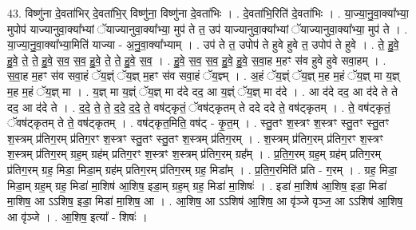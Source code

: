 \documentclass[17pt]{extarticle}
\begin{document}
43. विष्णु॑ना दे॒वता॑भिर् दे॒वता॑भि॒र् विष्णु॑ना॒ विष्णु॑ना दे॒वता॑भिः । . दे॒वता॑भि॒रिति॑ दे॒वता॑भिः । . या॒ज्या॒नु॒वा॒क्या᳚भ्या॒ मुपोप॑ याज्यानुवा॒क्या᳚भ्यां ॅयाज्यानुवा॒क्या᳚भ्या॒ मुप॑ ते त॒ उप॑ याज्यानुवा॒क्या᳚भ्यां ॅयाज्यानुवा॒क्या᳚भ्या॒ मुप॑ ते । . या॒ज्या॒नु॒वा॒क्या᳚भ्या॒मिति॑ याज्या - अ॒नु॒वा॒क्या᳚भ्याम् । . उप॑ ते त॒ उपोप॑ ते हुवे हुवे त॒ उपोप॑ ते हुवे । . ते॒ हु॒वे॒ हु॒वे॒ ते॒ ते॒ हु॒वे॒ स॒व॒ स॒व॒ हु॒वे॒ ते॒ ते॒ हु॒वे॒ स॒व॒ । . हु॒वे॒ स॒व॒ स॒व॒ हु॒वे॒ हु॒वे॒ स॒वा॒ह म॒हꣳ स॑व हुवे हुवे सवा॒हम् । . स॒वा॒ह म॒हꣳ स॑व सवा॒हं ॅय॒ज्ञ्ं ॅय॒ज्ञ् म॒हꣳ स॑व सवा॒हं ॅय॒ज्ञ्म् । . अ॒हं ॅय॒ज्ञ्ं ॅय॒ज्ञ् म॒ह म॒हं ॅय॒ज्ञ् मा य॒ज्ञ् म॒ह म॒हं ॅय॒ज्ञ् मा । . य॒ज्ञ् मा य॒ज्ञ्ं ॅय॒ज्ञ् मा द॑दे दद॒ आ य॒ज्ञ्ं ॅय॒ज्ञ् मा द॑दे । . आ द॑दे दद॒ आ द॑दे ते ते दद॒ आ द॑दे ते । . द॒दे॒ ते॒ ते॒ द॒दे॒ द॒दे॒ ते॒ वष॑ट्कृतं॒ ॅवष॑ट्कृतम् ते ददे ददे ते॒ वष॑ट्कृतम् । . ते॒ वष॑ट्कृतं॒ ॅवष॑ट्कृतम् ते ते॒ वष॑ट्कृतम् । . वष॑ट्कृत॒मिति॒ वष॑ट् - कृ॒त॒म् । . स्तु॒तꣳ श॒स्त्रꣳ श॒स्त्रꣳ स्तु॒तꣳ स्तु॒तꣳ श॒स्त्रम् प्र॑तिग॒रम् प्र॑तिग॒रꣳ श॒स्त्रꣳ स्तु॒तꣳ स्तु॒तꣳ श॒स्त्रम् प्र॑तिग॒रम् । . श॒स्त्रम् प्र॑तिग॒रम् प्र॑तिग॒रꣳ श॒स्त्रꣳ श॒स्त्रम् प्र॑तिग॒रम् ग्रह॒म् ग्रह॑म् प्रतिग॒रꣳ श॒स्त्रꣳ श॒स्त्रम् प्र॑तिग॒रम् ग्रह᳚म् । . प्र॒ति॒ग॒रम् ग्रह॒म् ग्रह॑म् प्रतिग॒रम् प्र॑तिग॒रम् ग्रह॒ मिडा॒ मिडा॒म् ग्रह॑म् प्रतिग॒रम् प्र॑तिग॒रम् ग्रह॒ मिडा᳚म् । . प्र॒ति॒ग॒रमिति॑ प्रति - ग॒रम् । . ग्रह॒ मिडा॒ मिडा॒म् ग्रह॒म् ग्रह॒ मिडा॑ मा॒शिष॑ आ॒शिष॒ इडा॒म् ग्रह॒म् ग्रह॒ मिडा॑ मा॒शिषः॑ । . इडा॑ मा॒शिष॑ आ॒शिष॒ इडा॒ मिडा॑ मा॒शिष॒ आ ऽऽशिष॒ इडा॒ मिडा॑ मा॒शिष॒ आ । . आ॒शिष॒ आ ऽऽशिष॑ आ॒शिष॒ आ वृ॑ञ्जे वृञ्ज॒ आ ऽऽशिष॑ आ॒शिष॒ आ वृ॑ञ्जे । . आ॒शिष॒ इत्या᳚ - शिषः॑ । \newline
\pagebreak
{}
\end{document}

